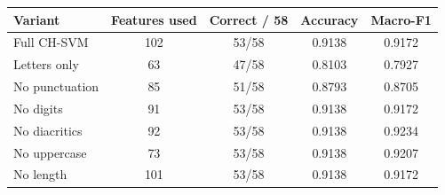 \begin{table}
  {\tablefont\begin{tabular}{lcccc}
    \hline
    Variant & Features used & Correct / 58 & Accuracy & Macro-F1\\
    \hline
    Full CH-SVM & 102 & 53/58 & 0.9138 & 0.9172\\
    Letters only & 63 & 47/58 & 0.8103 & 0.7927\\
    No punctuation & 85 & 51/58 & 0.8793 & 0.8705\\
    No digits & 91 & 53/58 & 0.9138 & 0.9172\\
    No diacritics & 92 & 53/58 & 0.9138 & 0.9234\\
    No uppercase & 73 & 53/58 & 0.9138 & 0.9207\\
    No length & 101 & 53/58 & 0.9138 & 0.9172\\
    \hline
  \end{tabular}}
  {}
\end{table}
